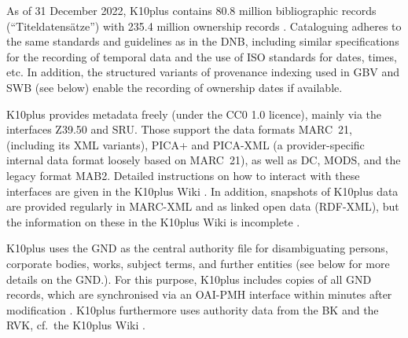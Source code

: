 As of 31 December 2022, K10plus contains 80.8 million bibliographic records (\enquote{Titeldatensätze})
with 235.4 million ownership records \autocite{GBV_K10plus_Statistik}.
Cataloguing adheres to the same standards and guidelines as in the DNB,
including similar specifications for the recording of temporal data and the use of ISO standards for dates, times, etc.
In addition, the structured variants of provenance indexing used in \gls{GBV} and \gls{SWB}
(see below) enable the recording of ownership dates if available.

K10plus provides metadata freely (under the CC0 1.0 licence),
mainly via the interfaces \gls{Z39.50} and \gls{SRU}.
Those support the data formats \gls{MARC}~21, (including its XML variants),
PICA+ and PICA-XML (a provider-specific internal data format loosely based on MARC~21),
as well as \gls{DC}, \gls{MODS}, and the legacy format \gls{MAB}2.
Detailed instructions on how to interact with these interfaces
are given in the K10plus Wiki \autocite{K10plusWiki}.
In addition, snapshots of K10plus data are provided regularly
in \gls{MARC}-XML and as linked open data (\gls{RDF}-XML), but the information
on these in the K10plus Wiki is incomplete \autocite{K10plusWikiOD}.

K10plus uses the \gls{GND} as the central authority file for disambiguating
persons, corporate bodies, works, subject terms, 
and further entities (see below for more details on the GND.).
For this purpose, K10plus includes 
copies of all \gls{GND} records, which are synchronised via an \gls{OAI-PMH} interface
within minutes after modification \autocite[cf.][]{K10plusHandbuchNormdaten}.
K10plus furthermore uses authority data from the \gls{BK} and the \gls{RVK},
cf.\ the K10plus Wiki \autocite{K10plusWikiNormdaten}.

